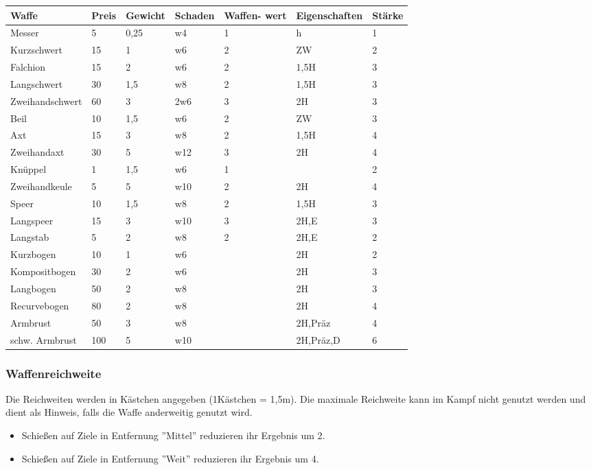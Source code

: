 \documentclass{article}
\begin{document}
\begin{small}
\begin{tabular}{|m{25mm}|m{1cm}|m{15mm}|m{15mm}|m{15mm}|m{25mm}|m{1cm}|}
\hline
\textbf{Waffe}&\textbf{Preis}&\textbf{Gewicht}&\textbf{Schaden}&\textbf{Waffen- wert}&\textbf{Eigenschaften}&\textbf{Stärke}\\
\hline
\hline
Messer&5&0,25&w4&1&h&1\\
\hline
Kurzschwert&15&1&w6&2&ZW&2\\
\hline
Falchion&15&2&w6&2&1,5H&3\\
\hline
Langschwert&30&1,5&w8&2&1,5H&3\\
\hline
Zweihandschwert&60&3&2w6&3&2H&3\\
\hline
Beil&10&1,5&w6&2&ZW&3\\
\hline
Axt&15&3&w8&2&1,5H&4\\
\hline
Zweihandaxt&30&5&w12&3&2H&4\\
\hline
Knüppel&1&1,5&w6&1&&2\\
\hline
Zweihandkeule&5&5&w10&2&2H&4\\
\hline
Speer&10&1,5&w8&2&1,5H&3\\
\hline
Langspeer&15&3&w10&3&2H,E&3\\
\hline
Langstab&5&2&w8&2&2H,E&2\\
\hline
Kurzbogen&10&1&w6&&2H&2\\
\hline
Kompositbogen&30&2&w6&&2H&3\\
\hline
Langbogen&50&2&w8&&2H&3\\
\hline
Recurvebogen&80&2&w8&&2H&4\\
\hline
Armbrust&50&3&w8&&2H,Präz&4\\
\hline
schw. Armbrust&100&5&w10&&2H,Präz,D&6\\
\hline
\end{tabular}
\end{small}

\subsubsection{Waffenreichweite}

Die Reichweiten werden in Kästchen angegeben (1Kästchen = 1,5m). Die maximale Reichweite kann im Kampf nicht genutzt
werden und dient als Hinweis, falls die Waffe anderweitig genutzt wird.

\begin{itemize}
\item Schießen auf Ziele in Entfernung ''Mittel'' reduzieren ihr Ergebnis um 2.
\item Schießen auf Ziele in Entfernung ''Weit'' reduzieren ihr Ergebnis um 4.
\end{itemize}
\end{document}
